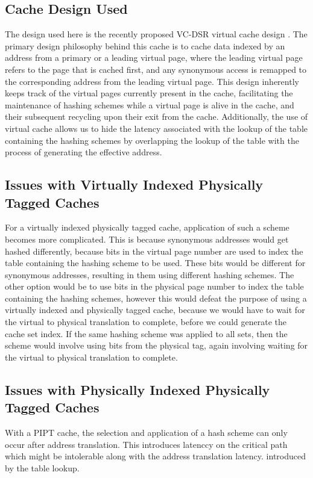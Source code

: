 \subsection{Cache Design Used}
The design used here is the recently proposed VC-DSR virtual cache design \cite{}. The primary design philosophy behind this cache is to cache data indexed by an address from a primary or a leading virtual page, where the leading virtual page refers to the page that is cached first, and any synonymous access is remapped to the corresponding address from the leading virtual page.  This design inherently keeps track of the virtual pages currently present in the cache, facilitating the maintenance of hashing schemes while a virtual page is alive in the cache, and their subsequent recycling upon their exit from the cache. Additionally, the use of virtual cache allows us to hide the latency associated with the lookup of the table containing the hashing schemes by overlapping the lookup of the table with the process of generating the effective address. 

\subsection{Issues with Virtually Indexed Physically Tagged Caches}
For a virtually indexed physically tagged cache, application of such a scheme becomes more complicated. This is because synonymous addresses would get hashed differently, because bits in the virtual page number are used to index the table containing the hashing scheme to be used. These bits would be different for synonymous addresses, resulting in them using different hashing schemes. The other option would be to use bits in the physical page number to index the table containing the hashing schemes, however this would defeat the purpose of using a virtually indexed and physically tagged cache, because we would have to wait for the virtual to physical translation to complete, before we could generate the cache set index. If the same hashing scheme was applied to all sets, then the scheme would involve using bits from the physical tag, again involving waiting for the virtual to physical translation to complete. 

\subsection{Issues with Physically Indexed Physically Tagged Caches}
With a PIPT cache, the selection and application of a hash scheme can only occur after address translation. This introduces latenccy on the critical path which might be intolerable along with the address translation latency.
introduced by the table lookup. 



